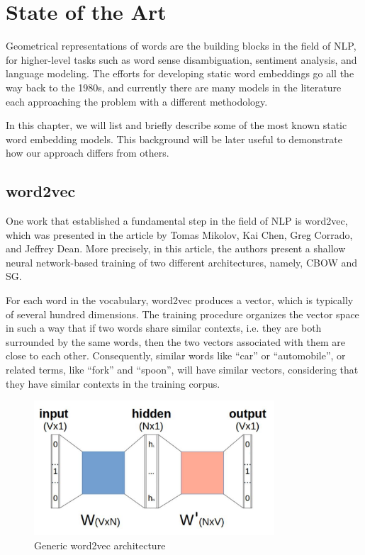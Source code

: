 
\chapter{State of the Art}
\label{chp:stateOfArt}

Geometrical representations of words are the building blocks in the field of \ac{NLP}, for higher-level tasks such as word sense disambiguation, sentiment analysis, and language modeling. The efforts for developing static word embeddings go all the way back to the 1980s, and currently there are many models in the literature each approaching the problem with a different methodology.

In this chapter, we will list and briefly describe some of the most known static word embedding models. This background will be later useful to demonstrate how our approach differs from others.

\section{word2vec}

One work that established a fundamental step in the field of \ac{NLP} is word2vec, which was presented in the article \cite{w2v} by Tomas Mikolov, Kai Chen, Greg Corrado, and Jeffrey Dean. More precisely, in this article, the authors present a shallow neural network-based training of two different architectures, namely, \ac{CBOW} and \ac{SG}.

For each word in the vocabulary, word2vec produces a vector, which is typically of several hundred dimensions. The training procedure organizes the vector space in such a way that if two words share similar contexts, i.e. they are both surrounded by the same words, then the two vectors associated with them are close to each other. Consequently, similar words like “car” or “automobile”, or related terms, like “fork” and “spoon”, will have similar vectors, considering that they have similar contexts in the training corpus. 

\begin{figure}[h]
    \centering
    \includegraphics[width=0.8\textwidth]{img/g1.PNG}
    \caption{Generic word2vec architecture}
    \label{fig:g1}
\end{figure}

